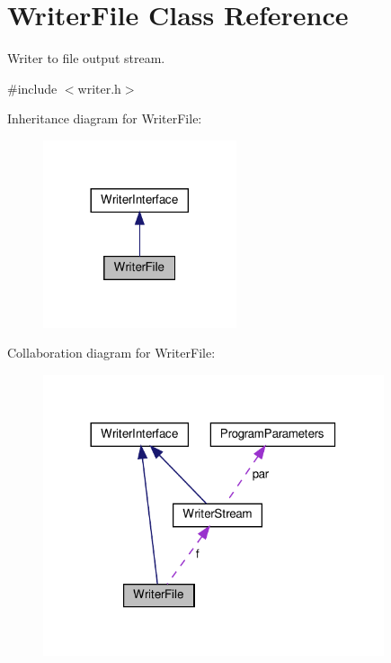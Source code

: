 \hypertarget{classWriterFile}{}\section{Writer\+File Class Reference}
\label{classWriterFile}


Writer to file output stream.  




{\ttfamily \#include $<$writer.\+h$>$}



Inheritance diagram for Writer\+File\+:
\nopagebreak
\begin{figure}[H]
\begin{center}
\leavevmode
\includegraphics[width=161pt]{classWriterFile__inherit__graph}
\end{center}
\end{figure}


Collaboration diagram for Writer\+File\+:
\nopagebreak
\begin{figure}[H]
\begin{center}
\leavevmode
\includegraphics[width=284pt]{classWriterFile__coll__graph}
\end{center}
\end{figure}
